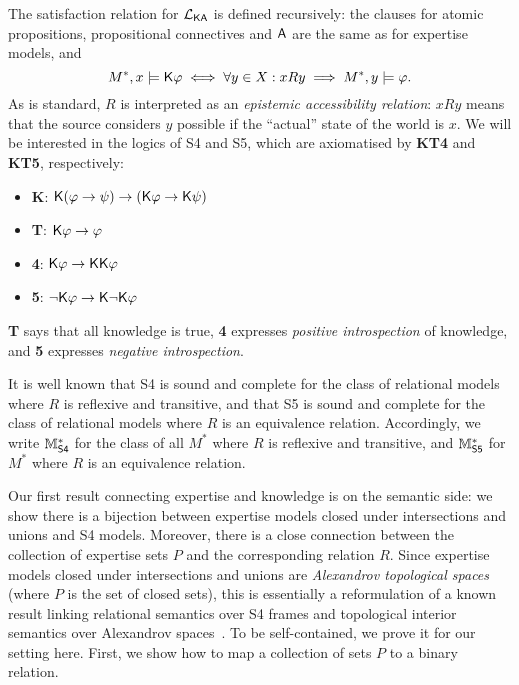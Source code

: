 The satisfaction relation for $\mathcal{L}_{\mathsf{K}\mathsf{A}}$ is defined recursively: the clauses
for atomic propositions, propositional connectives and $\mathsf{A}$ are the same
as for expertise models, and
\[
    M^*, x \models \mathsf{K}\varphi
    \iff
    \forall y \in X: xRy \implies M^*, y \models \varphi.
\]
As is standard, $R$ is interpreted as an \emph{epistemic accessibility relation}:
$xRy$ means that the source considers $y$ possible if the ``actual''
state of the world is $x$. We will be interested in the logics of S4 and
S5, which are axiomatised by \textbf{KT4} and \textbf{KT5}, respectively:

\begin{itemize}
    \item \textbf{K}: $\mathsf{K}(\varphi \to \psi) \to (\mathsf{K}\varphi \to
          \mathsf{K}\psi)$

    \item \textbf{T}: $\mathsf{K}\varphi \to \varphi$

    \item \textbf{4}: $\mathsf{K}\varphi \to \mathsf{K}\mathsf{K}\varphi$

    \item \textbf{5}: $\neg\mathsf{K}\varphi \to \mathsf{K}\neg\mathsf{K}\varphi$

\end{itemize}

\textbf{T} says that all knowledge is true, \textbf{4} expresses \emph{positive
introspection} of knowledge, and \textbf{5} expresses \emph{negative
introspection}.

It is well known that S4 is sound and complete for the class of relational
models where $R$ is reflexive and transitive, and that S5 is sound and complete
for the class of relational models where $R$ is an equivalence relation.
Accordingly, we write $\mathbb{M}^*_{\mathsf{S4}}$ for the class of all $M^*$ where $R$ is
reflexive and transitive, and $\mathbb{M}^*_{\mathsf{S5}}$ for $M^*$ where $R$ is an equivalence
relation.

Our first result connecting expertise and knowledge is on the semantic side: we
show there is a bijection between expertise models closed under intersections
and unions and S4 models. Moreover, there is a close connection between the
collection of expertise sets $P$ and the corresponding relation $R$.
Since expertise models closed under intersections and unions
are \emph{Alexandrov topological spaces} (where $P$ is the set of closed sets),
this is essentially a reformulation of a known result linking relational
semantics over S4 frames and topological interior semantics over Alexandrov
spaces~\cite{van2007modal,ozgun_evidence}.\footnotemark{} To be self-contained,
we prove it for our setting here. First, we show how to map a collection of
sets $P$ to a binary relation.

